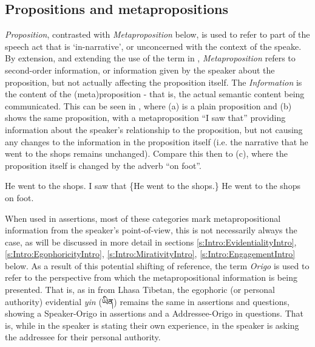 \subsection{Propositions and metapropositions}
\textit{Proposition}, contrasted with \textit{Metaproposition} below, is used to refer to part of the speech act that is `in-narrative', or unconcerned with the context of the speake. By extension, and extending the use of the term in , \textit{Metaproposition} refers to second-order information, or information given by the speaker about the proposition, but not actually affecting the proposition itself. The \textit{Information} is the content of the (meta)proposition - that is, the actual semantic content being communicated. This can be seen in , where (a) is a plain proposition and (b) shows the same proposition, with a metaproposition ``I saw that'' providing information about the speaker's relationship to the proposition, but not causing any changes to the information in the proposition itself (i.e. the narrative that he went to the shops remains unchanged). Compare this then to (c), where the proposition itself is changed by the adverb ``on foot''.

\begin{exe}
\ex\label{ex:MetapropEnglish}
\begin{xlist}
\ex He went to the shops.
\ex I saw that \{He went to the shops.\}
\ex He went to the shops on foot.
\end{xlist}
\end{exe}

When used in assertions, most of these categories mark metapropositional information from the speaker's point-of-view, this is not necessarily always the case, as will be discussed in more detail in sections \ref{s:Intro:EvidentialityIntro}, \ref{s:Intro:EgophoricityIntro}, \ref{s:Intro:MirativityIntro}, \ref{s:Intro:EngagementIntro} below. As a result of this potential shifting of reference, the term \textit{Origo} is used to refer to the perspective from which the metapropositional information is being presented. That is, as in  from Lhasa Tibetan, the egophoric (or personal authority) evidential \textit{yin} (\foreignlanguage{tibetan}{ཡིན}) remains the same in assertions and questions, showing a Speaker-Origo in assertions and a Addressee-Origo in questions. That is, while in  the speaker is stating their own experience, in  the speaker is asking the addressee for their personal authority.

